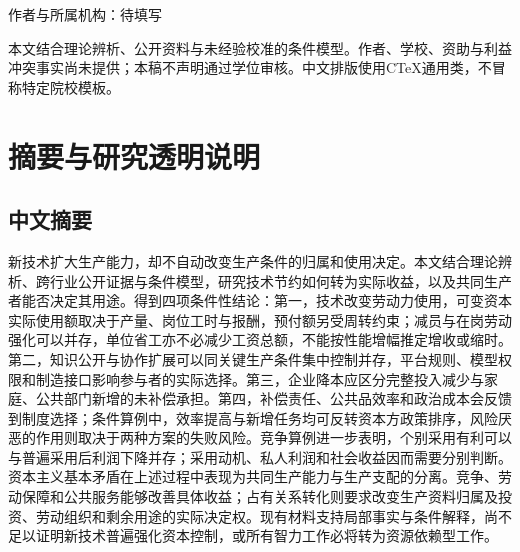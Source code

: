 \documentclass[UTF8,fontset=windows,12pt,a4paper,oneside,openany]{ctexbook}
\begin{document}
\begin{titlepage}\centering
\vspace*{25mm}{\Large 学位论文体例研究稿\par}
\vspace{18mm}{\Huge\bfseries 新技术对资本主义\\基本矛盾的影响\par}
\vspace{12mm}{\Large 从生产能力、市场实现与收益分配\\到社会再生产和决定权\par}
\vfill
{\large 作者与所属机构：待填写\par}
\vspace{8mm}{\large 2026年10月12日修订\par}
\vspace{8mm}\begin{minipage}{0.8\textwidth}\small
本文结合理论辨析、公开资料与未经验校准的条件模型。作者、学校、资助与利益冲突事实尚未提供；本稿不声明通过学位审核。中文排版使用CTeX通用类，不冒称特定院校模板。
\end{minipage}
\end{titlepage}
\frontmatter


\chapter*{摘要与研究透明说明}


\section*{中文摘要}

新技术扩大生产能力，却不自动改变生产条件的归属和使用决定。本文结合理论辨析、跨行业公开证据与条件模型，研究技术节约如何转为实际收益，以及共同生产者能否决定其用途。得到四项条件性结论：第一，技术改变劳动力使用，可变资本实际使用额取决于产量、岗位工时与报酬，预付额另受周转约束；减员与在岗劳动强化可以并存，单位省工亦不必减少工资总额，不能按性能增幅推定增收或缩时。第二，知识公开与协作扩展可以同关键生产条件集中控制并存，平台规则、模型权限和制造接口影响参与者的实际选择。第三，企业降本应区分完整投入减少与家庭、公共部门新增的未补偿承担。第四，补偿责任、公共品效率和政治成本会反馈到制度选择；条件算例中，效率提高与新增任务均可反转资本方政策排序，风险厌恶的作用则取决于两种方案的失败风险。竞争算例进一步表明，个别采用有利可以与普遍采用后利润下降并存；采用动机、私人利润和社会收益因而需要分别判断。资本主义基本矛盾在上述过程中表现为共同生产能力与生产支配的分离。竞争、劳动保障和公共服务能够改善具体收益；占有关系转化则要求改变生产资料归属及投资、劳动组织和剩余用途的实际决定权。现有材料支持局部事实与条件解释，尚不足以证明新技术普遍强化资本控制，或所有智力工作必将转为资源依赖型工作。
\end{document}
